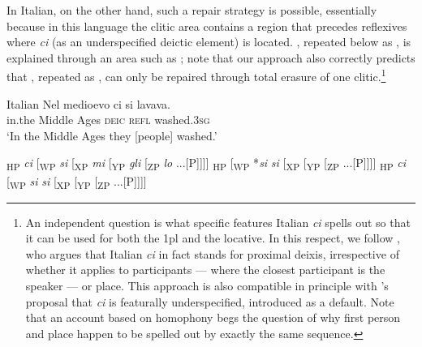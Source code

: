 \documentclass[output=paper,modfonts,nonflat,newtxmath,colorlinks,citecolor=brown]{langsci/langscibook}
\begin{document}
In Italian, on the other hand, such a repair strategy is possible, essentially because in this language the clitic area contains a region that precedes reflexives where \textit{ci} (as an underspecified deictic element) is located. , repeated below as , is explained through an area such as ; note that our approach also correctly predicts that , repeated as , can only be repaired through total erasure of one clitic.\footnote{An independent question is what specific features Italian \textit{ci} spells out so that it can be used for both the 1pl and the locative. In this respect, we follow \citet{Ferrazzano2003}, who argues that Italian \textit{ci} in fact stands for proximal deixis, irrespective of whether it applies to participants — where the closest participant is the speaker — or place. This approach is also compatible in principle with \citeauthor{Pescarini2007}’s proposal that \textit{ci} is featurally underspecified, introduced as a default. Note that an account based on homophony begs the question of why first person and place happen to be spelled out by exactly the same sequence.}

\ea%
    \label{ex:cabre:26}
     Italian
    \ex  \label{ex:cabre:26b}
    \gll Nel medioevo  ci  si  lavava. \\
    in.the {Middle Ages}  \textsc{deic} \textsc{refl}  washed.\textsc{3sg}  \\
    \glt  ‘In the Middle Ages they [people] washed.’
    \z
    \z


\ea%
    \label{ex:cabre:27}
    \ea {[}\textsubscript{HP}  \textit{ci}   [\textsubscript{WP}   \textit{si}  [\textsubscript{XP}  \textit{mi}  [\textsubscript{YP}  \textit{gli}  [\textsubscript{ZP} \textit{lo}  ...[\liv P]{]]]}
    \ex {[}\textsubscript{HP}     [\textsubscript{WP} *\textit{si} \textit{si}  [\textsubscript{XP}    [\textsubscript{YP}    [\textsubscript{ZP}   ...[\liv P]{]]]}
    \ex  {[}\textsubscript{HP}  \textit{ci}  [\textsubscript{WP}   \textit{si} \textit{si}  [\textsubscript{XP}     [\textsubscript{YP}    [\textsubscript{ZP}   ...[\liv P]{]]]}
    \z
    \z

\z
\end{document}
